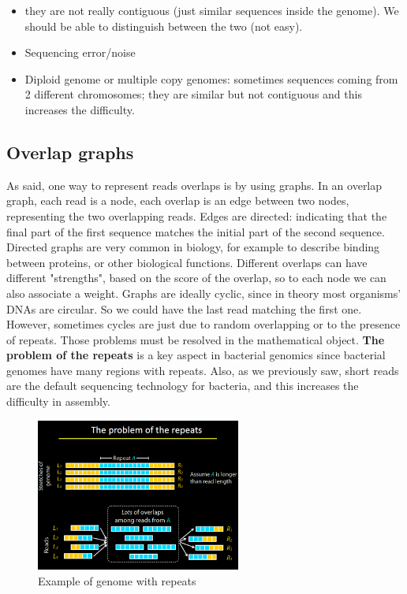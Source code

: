 \begin{itemize}
    \item they are not really contiguous (just similar sequences inside the genome). We should be able to distinguish between the two (not easy).
    \item Sequencing error/noise
    \item Diploid genome or multiple copy genomes: sometimes sequences coming from 2 different chromosomes; they are similar but not contiguous and this increases the difficulty.
\end{itemize}

\subsection{Overlap graphs}

As said, one way to represent reads overlaps is by using graphs. 
In an overlap graph, each read is a node, each overlap is an edge between two nodes, representing the two overlapping reads. Edges are directed: indicating that the final part of the first sequence matches the initial part of the second sequence. Directed graphs are very common in biology, for example to describe binding between proteins, or other biological functions.
Different overlaps can have different "strengths", based on the score of the overlap, so to each node we can also associate a weight.
Graphs are ideally cyclic, since in theory most organisms' DNAs are circular. So we could have the last read matching the first one. However, sometimes cycles are just due to random overlapping or to the presence of repeats. Those problems must be resolved in the mathematical object.
\textbf{The problem of the repeats} is a key aspect in bacterial genomics since bacterial genomes have many regions with repeats. Also, as we previously saw, short reads are the default sequencing technology for bacteria, and this increases the difficulty in assembly.

\begin{figure}[h]
\centering
\includegraphics[width=0.6\textwidth]{Repeats.png}
\caption{Example of genome with repeats}
\end{figure}

